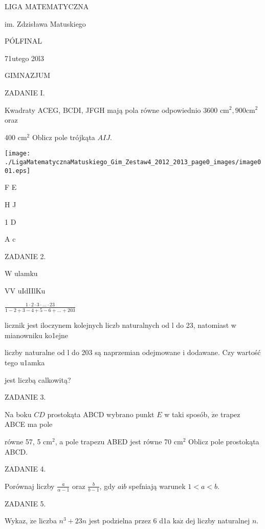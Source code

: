 \documentclass[a4paper,12pt]{article}
\begin{document}
LIGA MATEMATYCZNA

im. Zdzisława Matuskiego

PÓLFINAL

71utego 20l3

GIMNAZJUM

ZADANIE I.

Kwadraty ACEG, BCDI, JFGH mają pola równe odpowiednio 3600 $\mathrm{c}\mathrm{m}^{2}, 900 \mathrm{c}\mathrm{m}^{2}$ oraz

400 $\mathrm{c}\mathrm{m}^{2}$ Oblicz pole trójkąta $AIJ.$
\begin{center}
\texttt{[image: ./LigaMatematycznaMatuskiego\_Gim\_Zestaw4\_2012\_2013\_page0\_images/image001.eps]}
\end{center}
F  E

H  J

1  D

A  c

ZADANIE 2.

W ulamku

$\mathrm{V}\mathrm{V}$ uIdIIlKu

$\displaystyle \frac{1\cdot 2\cdot 3\cdot\ldots\cdot 23}{1-2+3-4+5-6+\ldots+203}$

licznik jest iloczynem kolejnych liczb naturalnych od l do 23, natomiast w mianowniku ko1ejne

liczby naturalne od l do 203 są naprzemian odejmowane i dodawane. Czy wartość tego u1amka

jest liczbą calkowitą?

ZADANIE 3.

Na boku $CD$ prostokąta ABCD wybrano punkt $E$ w taki sposób, $\dot{\mathrm{z}}\mathrm{e}$ trapez ABCE ma pole

równe 57, 5 $\mathrm{c}\mathrm{m}^{2}$, a pole trapezu ABED jest równe 70 $\mathrm{c}\mathrm{m}^{2}$ Oblicz pole prostokąta ABCD.

ZADANIE 4.

Porównaj liczby $\displaystyle \frac{a}{\alpha-1}$ oraz $\displaystyle \frac{b}{b-1}$, gdy $a\mathrm{i}b$ spefniają warunek $1<a<b.$

ZADANIE 5.

Wykaz, $\dot{\mathrm{z}}\mathrm{e}$ liczba $n^{3}+23n$ jest podzielna przez 6 d1a $\mathrm{k}\mathrm{a}\dot{\mathrm{z}}$ dej liczby naturalnej $n.$
\end{document}
